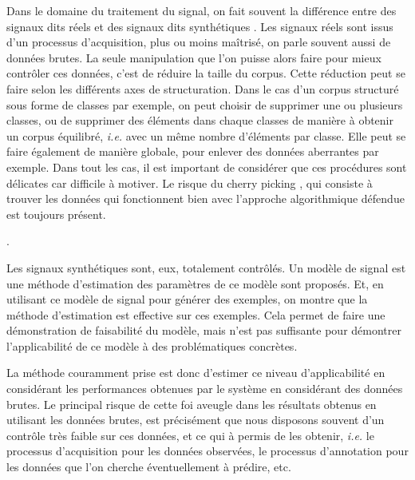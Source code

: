   Dans le domaine du traitement du signal, on fait souvent la différence entre des signaux dits \og réels \fg et des signaux dits \og synthétiques \fg. Les signaux réels sont issus d'un processus d'acquisition, plus ou moins maîtrisé, on parle souvent aussi de données brutes. La seule manipulation que l'on puisse alors faire pour mieux contrôler ces données, c'est de réduire la taille du corpus. Cette réduction peut se faire selon les différents axes de structuration. Dans le cas d'un corpus structuré sous forme de classes par exemple, on peut choisir de supprimer une ou plusieurs classes, ou de supprimer des éléments dans chaque classes de manière à obtenir un corpus équilibré, \textit{i.e.} avec un même nombre d'éléments par classe. Elle peut se faire également de manière globale, pour enlever des données aberrantes par exemple. Dans tout les cas, il est important de considérer que ces procédures sont délicates car difficile à motiver. Le risque du \og cherry picking \fg, qui consiste à trouver les données qui fonctionnent bien avec l'approche algorithmique défendue est toujours présent.

  .

  Les signaux synthétiques sont, eux, totalement contrôlés. Un modèle de signal est une méthode d'estimation des paramètres de ce modèle sont proposés. Et, en utilisant ce modèle de signal pour générer des exemples, on montre que la méthode d'estimation est effective sur ces exemples. Cela permet de faire une démonstration de faisabilité du modèle, mais n'est pas suffisante pour démontrer l'applicabilité de ce modèle à des problématiques concrètes.

  La méthode couramment prise est donc d'estimer ce niveau d'applicabilité en considérant les performances obtenues par le système en considérant des données brutes. Le principal risque de cette foi aveugle dans les résultats obtenus en utilisant les données brutes, est précisément que nous disposons souvent d'un contrôle très faible sur ces données, et ce qui à permis de les obtenir, \textit{i.e.} le processus d'acquisition pour les données observées, le processus d'annotation pour les données que l'on cherche éventuellement à prédire, etc.

